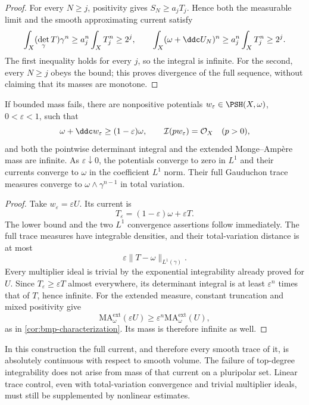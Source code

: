 \begin{proof}
For every $N\geq j$, positivity gives $S_N\geq a_jT_j$. Hence both the measurable limit and the smooth approximating current satisfy
\[
 \int_X(\det_\gamma T)\gamma^n
 \geq a_j^n\int_XT_j^n\geq2^j,
 \qquad
 \int_X(\omega+\ddc U_N)^n
 \geq a_j^n\int_XT_j^n\geq2^j.
\]
The first inequality holds for every $j$, so the integral is infinite. For the second, every $N\geq j$ obeys the bound; this proves divergence of the full sequence, without claiming that its masses are monotone.
\end{proof}

\begin{corollary}\label{cor:strong-linear-infinite-mass}
If bounded mass fails, there are nonpositive potentials $w_\varepsilon\in\PSH(X,\omega)$, $0<\varepsilon<1$, such that
\[
 \omega+\ddc w_\varepsilon\geq(1-\varepsilon)\omega,
 \qquad
 \mathcal I(pw_\varepsilon)=\mathcal O_X\quad(p>0),
\]
and both the pointwise determinant integral and the extended Monge--Amp\`ere mass are infinite. As $\varepsilon\downarrow0$, the potentials converge to zero in $L^1$ and their currents converge to $\omega$ in the coefficient $L^1$ norm. Their full Gauduchon trace measures converge to $\omega\wedge\gamma^{n-1}$ in total variation.
\end{corollary}
\begin{proof}
Take $w_\varepsilon=\varepsilon U$. Its current is
\[
 T_\varepsilon=(1-\varepsilon)\omega+\varepsilon T.
\]
The lower bound and the two $L^1$ convergence assertions follow immediately. The full trace measures have integrable densities, and their total-variation distance is at most
\[
 \varepsilon\|T-\omega\|_{L^1(\gamma)}.
\]
Every multiplier ideal is trivial by the exponential integrability already proved for $U$. Since $T_\varepsilon\geq\varepsilon T$ almost everywhere, its determinant integral is at least $\varepsilon^n$ times that of $T$, hence infinite. For the extended measure, constant truncation and mixed positivity give
\[
 \mathrm{MA}^{\mathrm{ext}}_\omega(\varepsilon U)
 \geq\varepsilon^n\mathrm{MA}^{\mathrm{ext}}_\omega(U),
\]
as in \cref{cor:bmp-characterization}. Its mass is therefore infinite as well.
\end{proof}

In this construction the full current, and therefore every smooth trace of it, is absolutely continuous with respect to smooth volume. The failure of top-degree integrability does not arise from mass of that current on a pluripolar set. Linear trace control, even with total-variation convergence and trivial multiplier ideals, must still be supplemented by nonlinear estimates.

